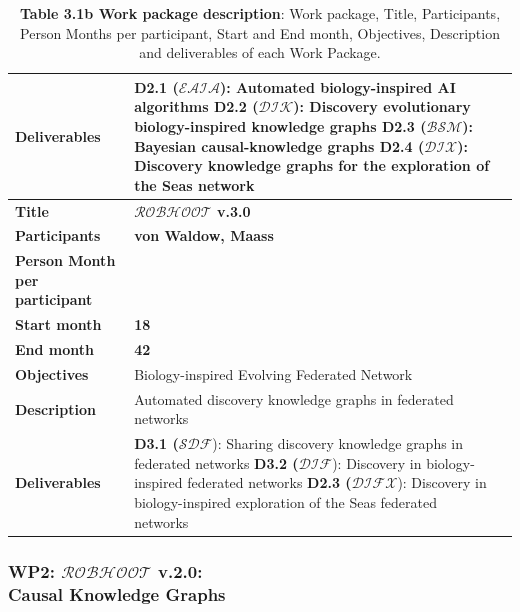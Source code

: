 \documentclass[11pt, a4paper]{article} %
\begin{document}
{\begin{table}[h!]
\begin{center}
\begin{tabular}{|m{3cm} || m{12cm} || m{1cm}|}
    \hline
    \rowcolor{piggypink!20}
    {\bf Deliverables} & {\bf D2.1 ($\mathcal{EAIA}$}): Automated biology-inspired AI algorithms        
                         {\bf D2.2 ($\mathcal{DIK}$}): Discovery evolutionary biology-inspired knowledge graphs
                         {\bf D2.3 ($\mathcal{BSM}$}): Bayesian causal-knowledge graphs                
                         {\bf D2.4 ($\mathcal{DIX}$}): Discovery knowledge graphs for the exploration of the Seas network  & \\
    \hline \hline\hline
    \rowcolor{piggypink!20}
    {\bf Title} & {\bf $\mathcal{ROBHOOT}$ v.3.0} &  \\
    \hline
    \rowcolor{piggypink!20}
    {\bf Participants} & {\bf von Waldow, Maass} & \\
    \hline
    \rowcolor{piggypink!20}
    {\bf Person Month per participant} & & \\
    \hline
    \rowcolor{piggypink!20}
    {\bf Start month} & {\bf 18} & \\
    \hline
    \rowcolor{piggypink!20}
    {\bf End month} & {\bf 42} & \\
    \hline
    \rowcolor{piggypink!20}
    {\bf Objectives} & Biology-inspired Evolving Federated Network & \\
    \hline
    \rowcolor{piggypink!20}
    {\bf Description} & Automated discovery knowledge graphs in federated networks & \\
    \hline
    \rowcolor{piggypink!20}
    {\bf Deliverables} & {\bf D3.1 ($\mathcal{SDF}$}): Sharing discovery knowledge graphs in federated networks
                         {\bf D3.2 ($\mathcal{DIF}$}): Discovery in biology-inspired federated networks 
                         {\bf D2.3 ($\mathcal{DIFX}$}): Discovery in biology-inspired exploration of the Seas federated networks  & \\
    \hline\hline\hline
  \end{tabular}
\end{center}
\caption*{{{\bf Table 3.1b Work package description}: Work package,
    Title, Participants, Person Months per participant, Start and End
    month, Objectives, Description and deliverables of each Work
    Package.}}
\end{table}

\subsubsection{{\bf WP2: $\mathcal{ROBHOOT}$ v.2.0}: \\
  Causal Knowledge Graphs}

}
\end{document}
